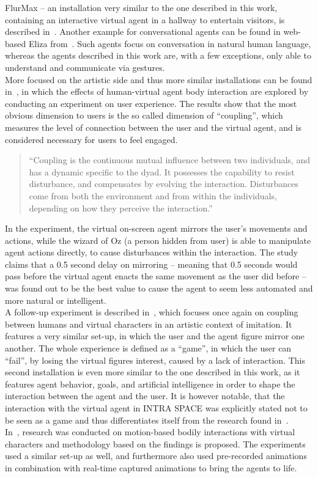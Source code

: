 \documentclass[draft,final]{vutinfth} %
\begin{document}
FlurMax – an installation very similar to the one described in this work, containing an interactive virtual agent in a hallway to entertain visitors, is described in~\cite{10.1007/978-3-540-39396-2_5}. 
Another example for conversational agents can be found in web-based Eliza from~\cite{llorach2017say}. 
Such agents focus on conversation in natural human language, whereas the agents described in this work are, with a few exceptions, only able to understand and communicate via gestures. \\
More focused on the artistic side and thus more similar installations can be found in~\cite{bevacqua2014effects}, in which the effects of human-virtual agent body interaction are explored by conducting an experiment on user experience. 
The results show that the most obvious dimension to users is the so called dimension of “coupling”, which measures the level of connection between the user and the virtual agent, and is considered necessary for users to feel engaged.
\begin{quote}
	``Coupling is the continuous mutual influence between two individuals, and has a dynamic specific to the dyad. It possesses the capability to resist disturbance, and compensates by evolving the interaction. Disturbances come from both the environment and from within the individuals, depending on how they perceive the interaction.''~\cite[p.~1]{bevacqua2014effects}
\end{quote}
In the experiment, the virtual on-screen agent mirrors the user’s movements and actions, while the wizard of Oz (a person hidden from user) is able to manipulate agent actions directly, to cause disturbances within the interaction. 
The study claims that a 0.5 second delay on mirroring – meaning that 0.5 seconds would pass before the virtual agent enacts the same movement as the user did before – was found out to be the best value to cause the agent to seem less automated and more natural or intelligent. \\
A follow-up experiment is described in~\cite{bevacqua2015gestural}, which focuses once again on coupling between humans and virtual characters in an artistic context of imitation. 
It features a very similar set-up, in which the user and the agent figure mirror one another. 
The whole experience is defined as a “game”, in which the user can “fail”, by losing the virtual figures interest, caused by a lack of interaction. 
This second installation is even more similar to the one described in this work, as it features agent behavior, goals, and artificial intelligence in order to shape the interaction between the agent and the user. 
It is however notable, that the interaction with the virtual agent in INTRA SPACE was explicitly stated not to be seen as a game and thus differentiates itself from the research found in~\cite{bevacqua2015gestural}. \\
In~\cite{pugliese2011framework}, research was conducted on motion-based bodily interactions with virtual characters and methodology based on the findings is proposed. 
The experiments used a similar set-up as well, and furthermore also used pre-recorded animations in combination with real-time captured animations to bring the agents to life.
\end{document}
